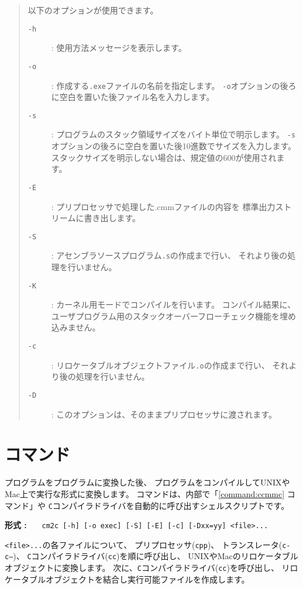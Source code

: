 \begin{quote}
\hspace{-1em}以下のオプションが使用できます。

\begin{description}
\item[{\tt -h}] : 使用方法メッセージを表示します。
\item[{\tt -o}] : 作成する{\tt .exe}ファイルの名前を指定します。
{\tt -o}オプションの後ろに空白を置いた後ファイル名を入力します。
\item[{\tt -s}] : プログラムのスタック領域サイズをバイト単位で明示します。
{\tt -s}オプションの後ろに空白を置いた後10進数でサイズを入力します。
スタックサイズを明示しない場合は、規定値の600が使用されます。
\item[{\tt -E}] : プリプロセッサで処理した{.cmm}ファイルの内容を
標準出力ストリームに書き出します。
\item[{\tt -S}] : アセンブラソースプログラム{\tt .s}の作成まで行い、
それより後の処理を行いません。
\item[{\tt -K}] : {\tacos}カーネル用モードでコンパイルを行います。
コンパイル結果に、
ユーザプログラム用のスタックオーバーフローチェック機能を埋め込みません。
\item[{\tt -c}] : リロケータブルオブジェクトファイル{\tt .o}の作成まで行い、
それより後の処理を行いません。
\item[{\tt -D}] : このオプションは、そのままプリプロセッサに渡されます。
\end{description}
\end{quote}

\section{{\cmc}コマンド}

{\cmm}プログラムを{\cl}プログラムに変換した後、
{\cl}プログラムをコンパイルしてUNIXやMac上で実行な形式に変換します。
{\cmc}コマンドは、内部で「\ref{command:ccmmc} {\ccmmc}コマンド」や
{\tt C}コンパイラドライバを自動的に呼び出すシェルスクリプトです。

\begin{flushleft}
{\bf 形式 : }~~~\verb/cm2c [-h] [-o exec] [-S] [-E] [-c] [-Dxx=yy] <file>.../
\end{flushleft}

{\tt <file>...}の各ファイルについて、
プリプロセッサ({\tt cpp})、
トランスレータ({\tt c-c--})、
{\tt C}コンパイラドライバ({\tt cc})を順に呼び出し、
UNIXやMacのリロケータブルオブジェクトに変換します。
次に、{\tt C}コンパイラドライバ({\tt cc})を呼び出し、
リロケータブルオブジェクトを結合し実行可能ファイルを作成します。

